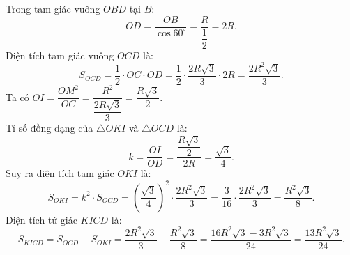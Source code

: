 \begin{bt}
{\begin{enumerate}[a)]
    Trong tam giác vuông $OBD$ tại $B$:
    $$OD = \dfrac{OB}{\cos 60^\circ} = \dfrac{R}{\dfrac{1}{2}} = 2R.$$
    Diện tích tam giác vuông $OCD$ là:
    $$S_{OCD} = \dfrac{1}{2} \cdot OC \cdot OD = \dfrac{1}{2} \cdot \dfrac{2R\sqrt{3}}{3} \cdot 2R = \dfrac{2R^2\sqrt{3}}{3}.$$
    Ta có $OI = \dfrac{OM^2}{OC} = \dfrac{R^2}{\dfrac{2R\sqrt{3}}{3}} = \dfrac{R\sqrt{3}}{2}$.\\
    Tỉ số đồng dạng của $\triangle OKI$ và $\triangle OCD$ là:
    $$k = \dfrac{OI}{OD} = \dfrac{\dfrac{R\sqrt{3}}{2}}{2R} = \dfrac{\sqrt{3}}{4}.$$
    Suy ra diện tích tam giác $OKI$ là:
    $$S_{OKI} = k^2 \cdot S_{OCD} = \left(\dfrac{\sqrt{3}}{4}\right)^2 \cdot \dfrac{2R^2\sqrt{3}}{3} = \dfrac{3}{16} \cdot \dfrac{2R^2\sqrt{3}}{3} = \dfrac{R^2\sqrt{3}}{8}.$$
    Diện tích tứ giác $KICD$ là:
    $$S_{KICD} = S_{OCD} - S_{OKI} = \dfrac{2R^2\sqrt{3}}{3} - \dfrac{R^2\sqrt{3}}{8} = \dfrac{16R^2\sqrt{3} - 3R^2\sqrt{3}}{24} = \dfrac{13R^2\sqrt{3}}{24}.$$
\end{enumerate}
}
\end{bt}


